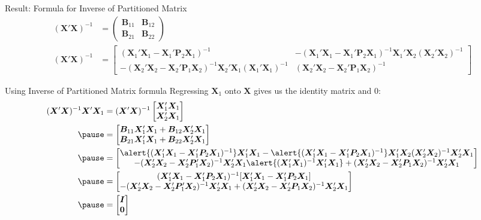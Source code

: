 \documentclass[aspectratio=169, handout, t]{beamer}
\numberwithin{equation}{section}
\begin{document}
\begin{frame}{Result: Formula for Inverse of Partitioned Matrix}
\begin{align*}
(\bm{X}'\bm{X})^{-1}&=\begin{pmatrix} \bm{B}_{11} & \bm{B}_{12}\\\bm{B}_{21} & \bm{B}_{22} \end{pmatrix}\\
(\bm{X}'\bm{X})^{-1}&=\begin{bmatrix} (\bm{X}_1'\bm{X}_1- \bm{X}_1'\bm{P}_2\bm{X}_1)^{-1}&-(\bm{X}_1'\bm{X}_1- \bm{X}_1'\bm{P}_2\bm{X}_1)^{-1}\bm{X}_1'\bm{X}_2 (\bm{X}_2'\bm{X}_2)^{-1} \\ 
-(\bm{X}_2'\bm{X}_2- \bm{X}_2'\bm{P}_1\bm{X}_2)^{-1} \bm{X}_2'\bm{X}_1 (\bm{X}_1'\bm{X}_1)^{-1} & (\bm{X}_2'\bm{X}_2- \bm{X}_2'\bm{P}_1\bm{X}_2)^{-1} \end{bmatrix}
\end{align*}
\end{frame}


\begin{frame}{Using Inverse of Partitioned Matrix formula}
Regressing $\bm{X}_1$ onto $\bm{X}$ gives us the identity matrix and 0:\pause
\begin{align*}
(\bm{X}'\bm{X})^{-1}\bm{X}'\bm{X}_1 &=(\bm{X}'\bm{X})^{-1} \begin{bmatrix} \bm{X}_1'\bm{X}_1\\ \bm{X}_2'\bm{X}_1\end{bmatrix} \\\pause
&=\begin{bmatrix} \bm{B}_{11}\bm{X}_1'\bm{X}_1 +\bm{B}_{12}\bm{X}_2'\bm{X}_1\\ \bm{B}_{21}\bm{X}_1'\bm{X}_1 +\bm{B}_{22}\bm{X}_2'\bm{X}_1\end{bmatrix}\\\pause
&=\begin{bmatrix} \alert{(\bm{X}_1'\bm{X}_1- \bm{X}_1'\bm{P}_2\bm{X}_1)^{-1}}\bm{X}_1'\bm{X}_1 -\alert{(\bm{X}_1'\bm{X}_1- \bm{X}_1'\bm{P}_2\bm{X}_1)^{-1}}\bm{X}_1'\bm{X}_2 (\bm{X}_2'\bm{X}_2)^{-1}\bm{X}_2'\bm{X}_1 \\
-(\bm{X}_2'\bm{X}_2- \bm{X}_2'\bm{P}_1'\bm{X}_2)^{-1} \bm{X}_2'\bm{X}_1 \alert{(\bm{X}_1'\bm{X}_1)^{-1}\bm{X}_1'\bm{X}_1} + (\bm{X}_2'\bm{X}_2- \bm{X}_2'\bm{P}_1\bm{X}_2)^{-1}\bm{X}_2'\bm{X}_1 \end{bmatrix}\\\pause
&=\begin{bmatrix} (\bm{X}_1'\bm{X}_1- \bm{X}_1'\bm{P}_2\bm{X}_1)^{-1}[\bm{X}_1'\bm{X}_1- \bm{X}_1'\bm{P}_2\bm{X}_1] \\ 	
-(\bm{X}_2'\bm{X}_2- \bm{X}_2'\bm{P}_1'\bm{X}_2)^{-1} \bm{X}_2'\bm{X}_1 + (\bm{X}_2'\bm{X}_2- \bm{X}_2'\bm{P}_1\bm{X}_2)^{-1}\bm{X}_2'\bm{X}_1 \end{bmatrix}\\\pause
&=\begin{bmatrix}\bm{I}\\\bm{0} \end{bmatrix}
\end{align*}
\end{frame}
\end{document}
